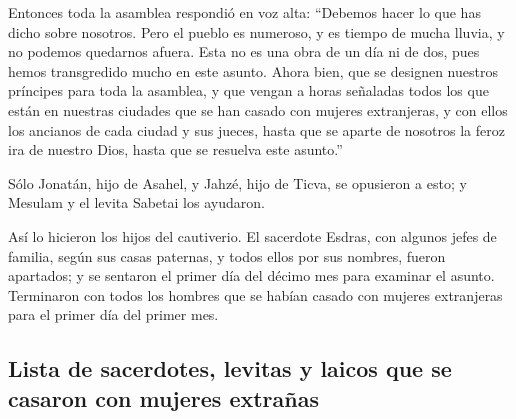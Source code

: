  Entonces toda la asamblea respondió en voz alta:
``Debemos hacer lo que has dicho sobre nosotros.  Pero el
pueblo es numeroso, y es tiempo de mucha lluvia, y no podemos quedarnos
afuera. Esta no es una obra de un día ni de dos, pues hemos transgredido
mucho en este asunto.  Ahora bien, que se designen
nuestros príncipes para toda la asamblea, y que vengan a horas señaladas
todos los que están en nuestras ciudades que se han casado con mujeres
extranjeras, y con ellos los ancianos de cada ciudad y sus jueces, hasta
que se aparte de nosotros la feroz ira de nuestro Dios, hasta que se
resuelva este asunto.''

 Sólo Jonatán, hijo de Asahel, y Jahzé, hijo de Ticva, se
opusieron a esto; y Mesulam y el levita Sabetai los ayudaron.

 Así lo hicieron los hijos del cautiverio. El sacerdote
Esdras, con algunos jefes de familia, según sus casas paternas, y todos
ellos por sus nombres, fueron apartados; y se sentaron el primer día del
décimo mes para examinar el asunto.  Terminaron con todos
los hombres que se habían casado con mujeres extranjeras para el primer
día del primer mes.

\hypertarget{lista-de-sacerdotes-levitas-y-laicos-que-se-casaron-con-mujeres-extrauxf1as}{%
\subsection{Lista de sacerdotes, levitas y laicos que se casaron con
mujeres
extrañas}\label{lista-de-sacerdotes-levitas-y-laicos-que-se-casaron-con-mujeres-extrauxf1as}}

